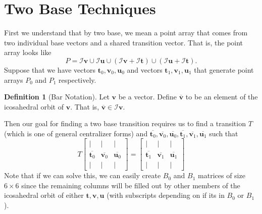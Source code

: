 \documentclass[a4paper,10pt]{article}
\theoremstyle{plain}
\theoremstyle{definition}
\newtheorem{Definition}[Theorem]{Definition}
\theoremstyle{remark}
\renewcommand{\vec}[1]{\textbf{#1}}
\begin{document}
\section{Two Base Techniques}
First we understand that by two base, we mean a point array that comes from two individual base vectors and a shared transition vector.
That is, the point array looks like \[P = \mathcal{I}\vec{v} \cup \mathcal{I}\vec{u} \cup (\mathcal{I}\vec{v} + \mathcal{I}\vec{t}) \cup (\mathcal{I}\vec{u} + \mathcal{I}\vec{t}).\]
Suppose that we have vectors \(\vec{t}_0, \vec{v}_0, \vec{u}_0\) and vectors \(\vec{t}_1, \vec{v}_1, \vec{u}_1\) that generate point arrays \(P_0\) and \(P_1\) respectively.

\begin{Definition}[Bar Notation]
    Let \(\vec{v}\) be a vector.
    Define \(\overline{\vec{v}}\) to be an element of the icosahedral orbit of \(\vec{v}\).
    That is, \(\overline{\vec{v}} \in \mathcal{I}\vec{v}\).
\end{Definition}
Then our goal for finding a two base transition requires us to find a transition \(T\) (which is one of general centralizer forms) and \(\overline{\vec{t}_0}, \overline{\vec{v}_0}, \overline{\vec{u}_0}, \overline{\vec{t}_1}, \overline{\vec{v}_1}, \overline{\vec{u}_1}\) such that
\begin{equation}
    \label{twobase-eq}
    T\begin{bmatrix}
        | & | & | \\
        \overline{\vec{t}_0} & \overline{\vec{v}_0} & \overline{\vec{u}_0} \\
        | & | & |
    \end{bmatrix} = \begin{bmatrix}
        | & | & | \\
        \overline{\vec{t}_1} & \overline{\vec{v}_1} & \overline{\vec{u}_1} \\
        | & | & |
    \end{bmatrix}
\end{equation}
 Note that if we can solve this, we can easily create \(B_0\) and \(B_1\) matrices of size \(6 \times 6\) since the remaining columns will be filled out by other members of the icosahedral orbit of either \(\vec{t}, \vec{v}, \vec{u}\) (with subscripts depending on if its in \(B_0\) or \(B_1\)).
\end{document}
